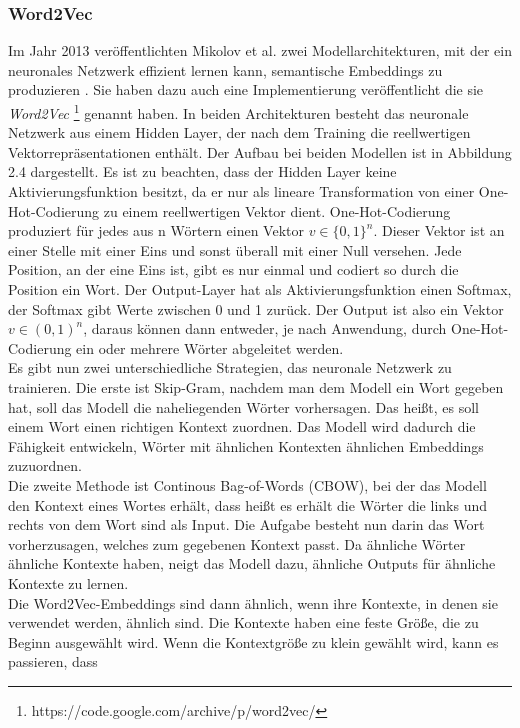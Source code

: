 \documentclass[12pt,letterpaper,ngerman]{article}
\begin{document}
\subsubsection{Word2Vec}
Im Jahr 2013 veröffentlichten Mikolov et al.  
zwei Modellarchitekturen, mit der ein
neuronales Netzwerk effizient lernen kann, semantische Embeddings
zu produzieren
\cite{word2vec}.
Sie haben dazu auch eine Implementierung veröffentlicht die sie 
\textit{Word2Vec} \footnote{https://code.google.com/archive/p/word2vec/}
genannt haben.
In beiden Architekturen besteht das neuronale Netzwerk aus einem 
Hidden Layer, der nach dem Training die reellwertigen 
Vektorrepräsentationen enthält.
Der Aufbau bei beiden Modellen ist in Abbildung 2.4 dargestellt.
Es ist zu beachten, dass der Hidden Layer keine Aktivierungsfunktion 
besitzt, da er nur als lineare Transformation von einer 
One-Hot-Codierung zu einem reellwertigen Vektor dient.
One-Hot-Codierung produziert für jedes aus n Wörtern einen Vektor
$v \in \{0,1\}^n$. Dieser Vektor ist an einer Stelle mit einer Eins
und sonst überall mit einer Null versehen. Jede Position, an der eine
Eins ist, gibt es nur einmal und codiert so durch die Position ein Wort.
Der Output-Layer hat als Aktivierungsfunktion einen Softmax, der 
Softmax gibt Werte zwischen 0 und 1 zurück. Der Output ist also ein 
Vektor $v \in (0,1)^n$, daraus können dann entweder, je nach Anwendung,
durch One-Hot-Codierung ein oder mehrere Wörter abgeleitet werden.\\
Es gibt nun zwei unterschiedliche Strategien, das neuronale Netzwerk
zu trainieren. Die erste ist Skip-Gram, nachdem man dem Modell ein 
Wort gegeben hat, soll das
Modell die naheliegenden Wörter vorhersagen. Das heißt, es soll einem
Wort einen richtigen Kontext zuordnen. Das Modell wird dadurch die
Fähigkeit entwickeln, Wörter mit ähnlichen Kontexten ähnlichen 
Embeddings zuzuordnen.\\
Die zweite Methode ist Continous Bag-of-Words (CBOW),
bei der das Modell den Kontext eines Wortes erhält,
dass heißt es erhält die Wörter die links und rechts von dem Wort
sind als Input. Die Aufgabe besteht nun darin das Wort vorherzusagen,
welches zum gegebenen Kontext passt.
Da ähnliche Wörter ähnliche Kontexte haben, neigt das Modell dazu,
ähnliche Outputs für ähnliche Kontexte zu lernen.\\
Die Word2Vec-Embeddings sind dann ähnlich, wenn ihre Kontexte,
in denen sie verwendet werden, ähnlich sind.  
Die Kontexte haben eine feste Größe, die zu Beginn ausgewählt wird.
Wenn die Kontextgröße zu klein gewählt wird, kann es passieren, dass 
\end{document}
